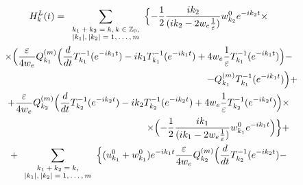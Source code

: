 \begin{multline*}

H^L_k(t)=\sum_{

\scriptsize

\begin{array}{c}

k_1+k_2=k,k\in \mathbb Z_0, \\|k_1|,|k_2|=1,\dots,m

\end{array}

} \Bigl\{-\frac12\frac{ik_2}{(ik_2-2w_e\frac1\varepsilon)}w^0_{k_2}e^{-ik_2t}\times

\\

\times \Bigl(\frac\varepsilon{4w_e}Q_{k_1}^{(m)}\Bigl(\frac{d}{dt}T^{-1}_{k_1}(e^{-ik_1t})-ik_1T^{-1}_{k_1}(e^{-ik_1t})+4w_e\frac{1}{\varepsilon}T^{-1}_{k_1}(e^{-ik_1t})\Bigr)-

\\

\;\hspace{7.5cm}

-Q_{k_1}^{(m)} T^{-1}_{k_1}(e^{-ik_1t})\Bigr)+

\\

+ \frac\varepsilon{4w_e}Q_{k_2}^{(m)}\Bigl(\frac{d}{dt}T^{-1}_{k_2}(e^{-ik_2t})-ik_2T^{-1}_{k_2}(e^{-ik_2t})+4w_e\frac{1}{\varepsilon}T^{-1}_{k_2}(e^{-ik_2t})\Bigr)\times

\\

\;\hspace{5cm}

\times\Bigl(-\frac12\frac{ik_1}{(ik_1-2w_e\frac1\varepsilon)}w^0_{k_1}e^{-ik_1t}\Bigr)

\Bigr\}+

\\

+\sum_{

\scriptsize

\begin{array}{c}

k_1+k_2=k, \\ |k_1|,|k_2|=1,\dots,m

\end{array}

}\Bigl\{(u_{k_1}^0+w^0_{k_1})e^{-ik_1t}\frac\varepsilon{4w_e}Q_{k_2}^{(m)}\Bigl(\frac{d}{dt}T^{-1}_{k_2}(e^{-ik_2t})-

\\


\end{multline*}
